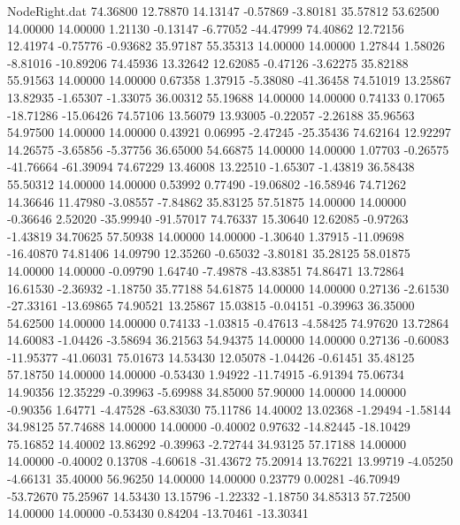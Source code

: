 \begin{filecontents}{NodeRight.dat}
  74.36800   12.78870   14.13147    -0.57869   -3.80181   35.57812   53.62500   14.00000   14.00000    1.21130   -0.13147   -6.77052  -44.47999
  74.40862   12.72156   12.41974    -0.75776   -0.93682   35.97187   55.35313   14.00000   14.00000    1.27844    1.58026   -8.81016  -10.89206
  74.45936   13.32642   12.62085    -0.47126   -3.62275   35.82188   55.91563   14.00000   14.00000    0.67358    1.37915   -5.38080  -41.36458
  74.51019   13.25867   13.82935    -1.65307   -1.33075   36.00312   55.19688   14.00000   14.00000    0.74133    0.17065  -18.71286  -15.06426
  74.57106   13.56079   13.93005    -0.22057   -2.26188   35.96563   54.97500   14.00000   14.00000    0.43921    0.06995   -2.47245  -25.35436
  74.62164   12.92297   14.26575    -3.65856   -5.37756   36.65000   54.66875   14.00000   14.00000    1.07703   -0.26575  -41.76664  -61.39094
  74.67229   13.46008   13.22510    -1.65307   -1.43819   36.58438   55.50312   14.00000   14.00000    0.53992    0.77490  -19.06802  -16.58946
  74.71262   14.36646   11.47980    -3.08557   -7.84862   35.83125   57.51875   14.00000   14.00000   -0.36646    2.52020  -35.99940  -91.57017
  74.76337   15.30640   12.62085    -0.97263   -1.43819   34.70625   57.50938   14.00000   14.00000   -1.30640    1.37915  -11.09698  -16.40870
  74.81406   14.09790   12.35260    -0.65032   -3.80181   35.28125   58.01875   14.00000   14.00000   -0.09790    1.64740   -7.49878  -43.83851
  74.86471   13.72864   16.61530    -2.36932   -1.18750   35.77188   54.61875   14.00000   14.00000    0.27136   -2.61530  -27.33161  -13.69865
  74.90521   13.25867   15.03815    -0.04151   -0.39963   36.35000   54.62500   14.00000   14.00000    0.74133   -1.03815   -0.47613   -4.58425
  74.97620   13.72864   14.60083    -1.04426   -3.58694   36.21563   54.94375   14.00000   14.00000    0.27136   -0.60083  -11.95377  -41.06031
  75.01673   14.53430   12.05078    -1.04426   -0.61451   35.48125   57.18750   14.00000   14.00000   -0.53430    1.94922  -11.74915   -6.91394
  75.06734   14.90356   12.35229    -0.39963   -5.69988   34.85000   57.90000   14.00000   14.00000   -0.90356    1.64771   -4.47528  -63.83030
  75.11786   14.40002   13.02368    -1.29494   -1.58144   34.98125   57.74688   14.00000   14.00000   -0.40002    0.97632  -14.82445  -18.10429
  75.16852   14.40002   13.86292    -0.39963   -2.72744   34.93125   57.17188   14.00000   14.00000   -0.40002    0.13708   -4.60618  -31.43672
  75.20914   13.76221   13.99719    -4.05250   -4.66131   35.40000   56.96250   14.00000   14.00000    0.23779    0.00281  -46.70949  -53.72670
  75.25967   14.53430   13.15796    -1.22332   -1.18750   34.85313   57.72500   14.00000   14.00000   -0.53430    0.84204  -13.70461  -13.30341

\end{filecontents}
